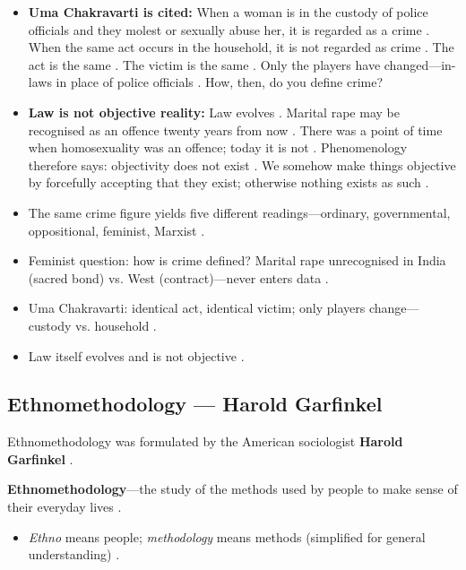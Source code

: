 \begin{CriticalPoint}
\begin{itemize}
    \item \textbf{Uma Chakravarti is cited:} When a woman is in the custody of police officials and they molest or sexually abuse her, it is regarded as a crime . When the same act occurs in the household, it is not regarded as crime . The act is the same . The victim is the same . Only the players have changed---in-laws in place of police officials . How, then, do you define crime? 
    \item \textbf{Law is not objective reality:} Law evolves . Marital rape may be recognised as an offence twenty years from now . There was a point of time when homosexuality was an offence; today it is not . Phenomenology therefore says: objectivity does not exist . We somehow make things objective by forcefully accepting that they exist; otherwise nothing exists as such .
\end{itemize}
\end{CriticalPoint}

\begin{QuickRevision}
\begin{itemize}
    \item The same crime figure yields five different readings---ordinary, governmental, oppositional, feminist, Marxist .
    \item Feminist question: how is crime defined? Marital rape unrecognised in India (sacred bond) vs. West (contract)---never enters data .
    \item Uma Chakravarti: identical act, identical victim; only players change---custody vs. household .
    \item Law itself evolves and is not objective .
\end{itemize}
\end{QuickRevision}

\subsection{Ethnomethodology --- Harold Garfinkel}
Ethnomethodology was formulated by the American sociologist \textbf{Harold Garfinkel} .

\begin{KeyConcept}
\textbf{Ethnomethodology}---the study of the methods used by people to make sense of their everyday lives .
\begin{itemize}
    \item \textit{Ethno} means people; \textit{methodology} means methods (simplified for general understanding) .
\end{itemize}
\end{KeyConcept}

